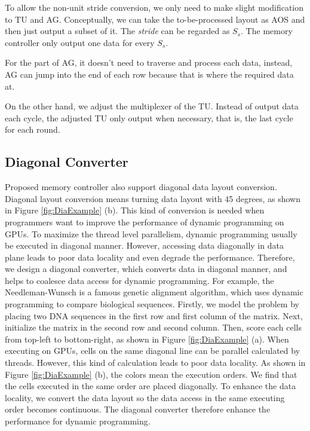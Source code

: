 \documentclass[10pt,journal,compsoc]{IEEEtran}
\begin{document}
To allow the non-unit stride conversion, we only need to make slight modification to TU and AG. Conceptually, we can take the to-be-processed layout as AOS and then just output a subset of it.
The \textit{stride} can be regarded as $S_{s}$. The memory controller only output one data for every $S_{s}$.

For the part of AG, it doesn't need to traverse and process each data, instead, AG can jump into the end of each row because that is where the required data at.

On the other hand, we adjust the multiplexer of the TU. Instead of output data each cycle, the adjusted TU only output when necessary, that is, the last cycle for each round.




\subsection{Diagonal Converter}\label{Diagonal}

Proposed memory controller also support diagonal data layout conversion. Diagonal layout conversion means turning data layout with 45 degrees, as shown in Figure  \ref{fig:DiaExample} (b). This kind of conversion is needed when programmers want to improve the performance of   dynamic programming on GPUs. To maximize the thread level parallelism, dynamic programming usually be executed in diagonal manner. However, accessing data diagonally in data plane leads to poor data locality and even degrade the performance.
Therefore, we design a diagonal converter, which converts data in diagonal manner, and helps to coalesce data access for dynamic programming.
 For example, the Needleman-Wunsch \cite{NW} is a famous genetic alignment algorithm, which uses dynamic programming to compare biological sequences.
 Firstly, we model the problem by placing two DNA sequences in the first row and first column of the matrix. Next, initialize the matrix in the second row and second column. Then, score each cells from top-left to bottom-right, as shown in Figure \ref{fig:DiaExample} (a). When  executing on GPUs, cells on the same diagonal line can be parallel calculated by threads. However, this kind of calculation leads to poor data locality. As shown in Figure \ref{fig:DiaExample} (b), the colors mean the execution orders. We find that the cells executed in the same order are placed diagonally. To enhance the data locality, we convert the data layout so the data access in the same executing order becomes continuous. The diagonal converter therefore enhance the performance for dynamic programming.
\end{document}
